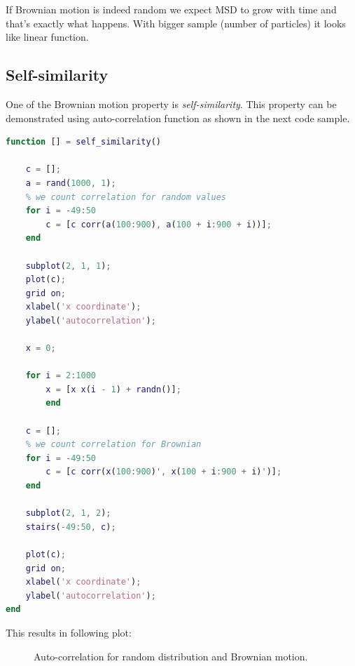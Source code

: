 \documentclass[12pt]{article}
\begin{document}
If Brownian motion is indeed random we expect MSD to grow with time and that's exactly what happens. With bigger sample (number of particles) it looks like linear function.

\subsection{Self-similarity}
One of the Brownian motion property is \textit{self-similarity}. This property can be demonstrated using auto-correlation function as shown in the next code sample.

\begin{lstlisting}[language=Matlab, caption = {Source code for auto-correlation}]
function [] = self_similarity()

	c = [];
	a = rand(1000, 1);
	% we count correlation for random values
	for i = -49:50
		c = [c corr(a(100:900), a(100 + i:900 + i))];
	end

	subplot(2, 1, 1);
	plot(c);
	grid on;
	xlabel('x coordinate');
	ylabel('autocorrelation');

	x = 0;

	for i = 2:1000
		x = [x x(i - 1) + randn()];
		end

	c = [];
	% we count correlation for Brownian
	for i = -49:50
		c = [c corr(x(100:900)', x(100 + i:900 + i)')];
	end

	subplot(2, 1, 2);
	stairs(-49:50, c);

	plot(c);
	grid on;
	xlabel('x coordinate');
	ylabel('autocorrelation');
end
\end{lstlisting}

This results in following plot:

\begin{figure}[H]
	\centering
	\caption{Auto-correlation for random distribution and Brownian motion.}
\end{figure}
\end{document}
